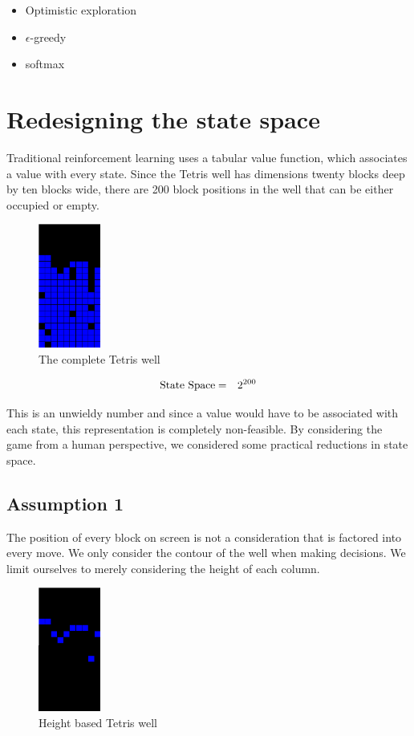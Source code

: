 \documentclass{rucsthesis}
\begin{document}
\begin{itemize}
\item{Optimistic exploration}
\item{$\epsilon$-greedy}
\item{softmax}
\end{itemize}

\section{Redesigning the state space}

Traditional reinforcement learning uses a tabular value function, which associates a value with every state. Since the Tetris well has dimensions twenty blocks deep by ten blocks wide, there are 200 block positions in the well that can be either occupied or empty.

\begin{figure}[h]
\centering
\includegraphics[width=0.8in]{fullwell.png}
\caption{The complete Tetris well}
\label{fig:fullwell}
\end{figure}

\begin{eqnarray}
\centering
\textrm{State Space} & = & 2^{200} 
\end{eqnarray}

This is an unwieldy number and since a value would have to be associated with each state, this representation is completely non-feasible. By considering the game from a human perspective, we considered some practical reductions in state space. 

\subsection*{Assumption 1}

The position of every block on screen is not a consideration that is factored into every move. We only consider the contour of the well when making decisions. We limit ourselves to merely considering the height of each column.

\begin{figure}[h]
\centering
\includegraphics[width=0.8in]{heightwell.png}
\caption{Height based Tetris well}
\label{fig:heightwell}
\end{figure}
\end{document}

